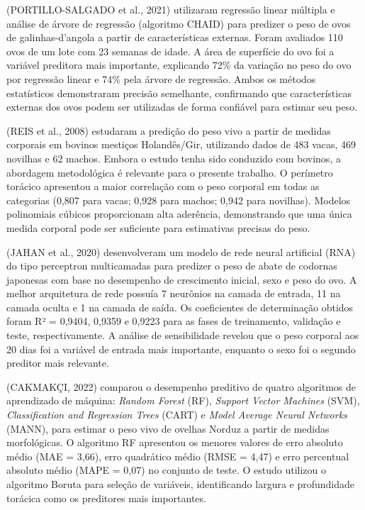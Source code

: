 \documentclass[12pt]{article}
\begin{document}
(PORTILLO-SALGADO et al., 2021) utilizaram regressão linear múltipla e análise
de árvore de regressão (algoritmo CHAID) para predizer o peso de ovos de
galinhas-d'angola a partir de características externas. Foram avaliados 110 ovos
de um lote com 23 semanas de idade. A área de superfície do ovo foi a variável
preditora mais importante, explicando 72\% da variação no peso do ovo por
regressão linear e 74\% pela árvore de regressão. Ambos os métodos estatísticos
demonstraram precisão semelhante, confirmando que características externas dos
ovos podem ser utilizadas de forma confiável para estimar seu peso.

(REIS et al., 2008) estudaram a predição do peso vivo a partir de medidas
corporais em bovinos mestiços Holandês/Gir, utilizando dados de 483 vacas, 469
novilhas e 62 machos. Embora o estudo tenha sido conduzido com bovinos, a
abordagem metodológica é relevante para o presente trabalho. O perímetro
torácico apresentou a maior correlação com o peso corporal em todas as
categorias (0,807 para vacas; 0,928 para machos; 0,942 para novilhas). Modelos
polinomiais cúbicos proporcionam alta aderência, demonstrando que uma única
medida corporal pode ser suficiente para estimativas precisas do peso.

(JAHAN et al., 2020) desenvolveram um modelo de rede neural artificial (RNA) do
tipo perceptron multicamadas para predizer o peso de abate de codornas
japonesas com base no desempenho de crescimento inicial, sexo e peso do ovo. A
melhor arquitetura de rede possuía 7 neurônios na camada de entrada, 11 na
camada oculta e 1 na camada de saída. Os coeficientes de determinação obtidos
foram R² = 0,9404, 0,9359 e 0,9223 para as fases de treinamento, validação e
teste, respectivamente. A análise de sensibilidade revelou que o peso corporal
aos 20 dias foi a variável de entrada mais importante, enquanto o sexo foi o
segundo preditor mais relevante.

(CAKMAKÇI, 2022) comparou o desempenho preditivo de quatro algoritmos de
aprendizado de máquina: \textit{Random Forest} (RF), \textit{Support Vector
Machines} (SVM), \textit{Classification and Regression Trees} (CART) e
\textit{Model Average Neural Networks} (MANN), para estimar o peso vivo de
ovelhas Norduz a partir de medidas morfológicas. O algoritmo RF apresentou os
menores valores de erro absoluto médio (MAE = 3,66), erro quadrático médio
(RMSE = 4,47) e erro percentual absoluto médio (MAPE = 0,07) no conjunto de
teste. O estudo utilizou o algoritmo Boruta para seleção de variáveis,
identificando largura e profundidade torácica como os preditores mais
importantes.
\end{document}
